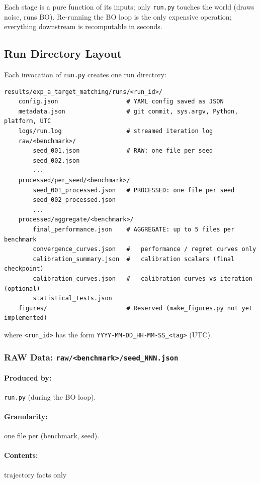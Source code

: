 \documentclass[11pt]{article}
\begin{document}
Each stage is a pure function of its inputs; only \texttt{run.py} touches the world
(draws noise, runs BO).
Re-running the BO loop is the only expensive operation; everything downstream is
recomputable in seconds.
 
\subsection{Run Directory Layout}
\label{sec:run-dir}
 
Each invocation of \texttt{run.py} creates one run directory:
 
\begin{lstlisting}
results/exp_a_target_matching/runs/<run_id>/
    config.json                   # YAML config saved as JSON
    metadata.json                 # git commit, sys.argv, Python, platform, UTC
    logs/run.log                  # streamed iteration log
    raw/<benchmark>/
        seed_001.json             # RAW: one file per seed
        seed_002.json
        ...
    processed/per_seed/<benchmark>/
        seed_001_processed.json   # PROCESSED: one file per seed
        seed_002_processed.json
        ...
    processed/aggregate/<benchmark>/
        final_performance.json    # AGGREGATE: up to 5 files per benchmark
        convergence_curves.json   #   performance / regret curves only
        calibration_summary.json  #   calibration scalars (final checkpoint)
        calibration_curves.json   #   calibration curves vs iteration (optional)
        statistical_tests.json
    figures/                      # Reserved (make_figures.py not yet implemented)
\end{lstlisting}
 
where \texttt{<run\_id>} has the form \texttt{YYYY-MM-DD\_HH-MM-SS\_<tag>} (UTC).
 
\subsubsection{RAW Data: \texttt{raw/<benchmark>/seed\_NNN.json}}
\label{sec:raw}
 
\paragraph{Produced by:} \texttt{run.py} (during the BO loop).
\paragraph{Granularity:} one file per (benchmark, seed).
\paragraph{Contents:} trajectory facts only 
 
\end{document}
